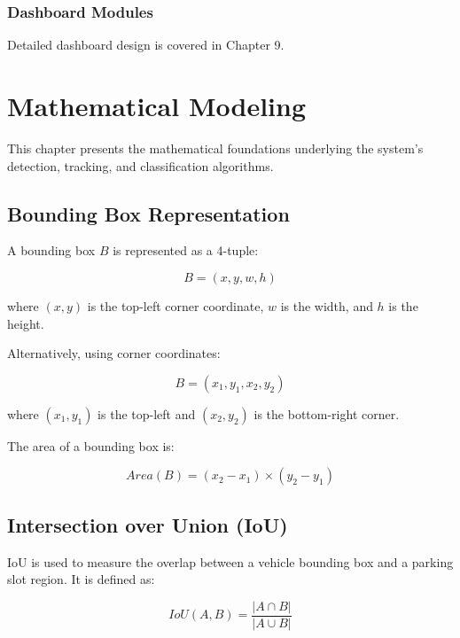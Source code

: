 \documentclass[12pt,a4paper]{report}
\begin{document}
\subsection{Dashboard Modules}
Detailed dashboard design is covered in Chapter 9.


\chapter{Mathematical Modeling}

This chapter presents the mathematical foundations underlying the system's detection, tracking, and classification algorithms.

\section{Bounding Box Representation}

A bounding box $B$ is represented as a 4-tuple:

\begin{equation}
B = (x, y, w, h)
\end{equation}

where $(x, y)$ is the top-left corner coordinate, $w$ is the width, and $h$ is the height.

Alternatively, using corner coordinates:

\begin{equation}
B = (x_1, y_1, x_2, y_2)
\end{equation}

where $(x_1, y_1)$ is the top-left and $(x_2, y_2)$ is the bottom-right corner.

The area of a bounding box is:

\begin{equation}
Area(B) = (x_2 - x_1) \times (y_2 - y_1)
\end{equation}


\section{Intersection over Union (IoU)}

IoU is used to measure the overlap between a vehicle bounding box and a parking slot region. It is defined as:

\begin{equation}
IoU(A, B) = \frac{|A \cap B|}{|A \cup B|}
\end{equation}
\end{document}
